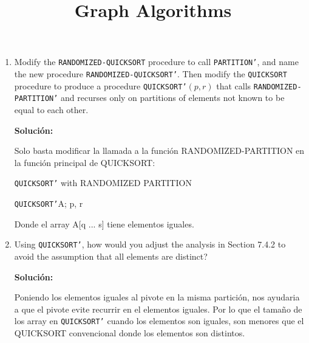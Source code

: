 \documentclass{article}
\begin{document}
\begin{enumerate}[label=(\alph*)]
  \item Modify the \texttt{RANDOMIZED-QUICKSORT} procedure to call \texttt{PARTITION'}, and name the new procedure \texttt{RANDOMIZED-QUICKSORT'}. Then modify the \texttt{QUICKSORT} procedure to produce a procedure \texttt{QUICKSORT'}$(p,r)$ that calls \texttt{RANDOMIZED-PARTITION'} and recurses only on partitions of elements not known to be equal to each other.
  
  \textbf{Solución:}
  
  Solo basta modificar la llamada a la función RANDOMIZED-PARTITION en la función principal de QUICKSORT:
  
  \begin{algorithm}[H]
   \caption{\texttt{QUICKSORT'} with RANDOMIZED PARTITION}
   \texttt{QUICKSORT'}A; p, r\\
  \end{algorithm}
  
  Donde el array A[q ... s] tiene elementos iguales.
  
  \item Using \texttt{QUICKSORT'}, how would you adjust the analysis in Section 7.4.2 to avoid the assumption that all elements are distinct?
  
  \textbf{Solución:}
  
  Poniendo los elementos iguales al pivote en la misma partición, nos ayudaria a que el pivote evite recurrir en el elementos iguales. Por lo que el tamaño de los array en \texttt{QUICKSORT'} cuando los elementos son iguales, son menores que el QUICKSORT convencional donde los elementos son distintos.
  
\end{enumerate}



\title{Graph Algorithms}
\date{}
\maketitle
\setcounter{section}{0}
\end{document}
